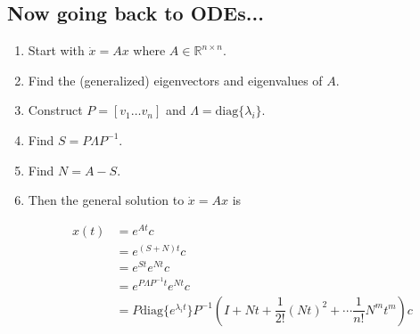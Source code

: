 \documentclass[12pt]{article}
\theoremstyle{definition}
\begin{document}
\subsection{Now going back to ODEs...}

\begin{enumerate}
\item Start with $\dot x = Ax$ where $A \in \mathbb{R}^{n \times n}$.
\item Find the (generalized) eigenvectors and eigenvalues of $A$.
\item Construct $P = [v_1 \ldots v_n]$ and $\Lambda = \text{diag}\{\lambda_i \}$.
\item Find $S = P \Lambda P^{-1}$.
\item Find $N = A - S$.
\item Then the general solution to $\dot x = Ax$ is

\begin{equation*}
\begin{split}
x(t) &= e^{At}c \\
&= e^{(S + N)t} c \\
&= e^{St}e^{Nt}c \\
&= e^{P \Lambda P^{-1}t} e^{Nt} c \\
&= P \text{diag} \{ e^{\lambda_i t} \} P^{-1} (I + Nt + \dfrac{1}{2!} (Nt)^2 + \cdots \dfrac{1}{n!} N^m t^m) c \\
\end{split}
\end{equation*}
\end{enumerate}
\end{document}
